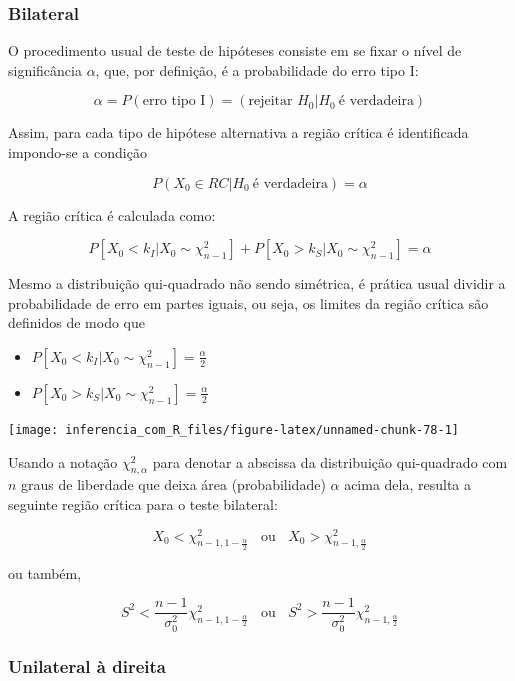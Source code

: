 \documentclass[
]{book}
\providecommand{\tightlist}{%
  \setlength{\itemsep}{0pt}\setlength{\parskip}{0pt}}
\begin{document}
\hypertarget{bilateral-2}{%
\subsubsection{Bilateral}\label{bilateral-2}}

O procedimento usual de teste de hipóteses consiste em se fixar o nível de significância \(\alpha\), que, por definição, é a probabilidade do erro tipo I:

\[\alpha=P(\text{erro tipo I})=(\text{rejeitar }H_0|H_0~\text{é verdadeira})\]

Assim, para cada tipo de hipótese alternativa a região crítica é identificada impondo-se a condição

\[P(X_0 \in RC|H_0~\text{é verdadeira})=\alpha\]

A região crítica é calculada como:

\[P\left[X_0<k_I|X_0\sim\chi^2_{n-1}\right]+P\left[X_0>k_S|X_0\sim\chi^2_{n-1}\right]=\alpha\]

Mesmo a distribuição qui-quadrado não sendo simétrica, é prática usual dividir a probabilidade de erro em partes iguais, ou seja, os limites da região crítica são definidos de modo que

\begin{itemize}
\tightlist
\item
  \(P\left[X_0<k_I|X_0\sim\chi^2_{n-1}\right]=\frac{\alpha}{2}\)
\item
  \(P\left[X_0>k_S|X_0\sim\chi^2_{n-1}\right]=\frac{\alpha}{2}\)
\end{itemize}

\begin{center}\texttt{[image: inferencia\_com\_R\_files/figure-latex/unnamed-chunk-78-1]} \end{center}

Usando a notação \(\chi^2_{n,\alpha}\) para denotar a abscissa da distribuição qui-quadrado com \(n\) graus de liberdade que deixa área (probabilidade) \(\alpha\) acima dela, resulta a seguinte região crítica para o teste bilateral:

\[X_0<\chi^2_{n-1,1-\frac{\alpha}{2}}~~~~\text{ou}~~~~X_0>\chi^2_{n-1,\frac{\alpha}{2}}\]

ou também,

\[S^2<\frac{n-1}{\sigma^2_0}\chi^2_{n-1,1-\frac{\alpha}{2}}~~~~\text{ou}~~~~S^2>\frac{n-1}{\sigma^2_0}\chi^2_{n-1,\frac{\alpha}{2}}\]

\hypertarget{unilateral-uxe0-direita-2}{%
\subsubsection{Unilateral à direita}\label{unilateral-uxe0-direita-2}}
\end{document}
